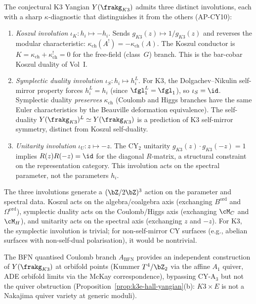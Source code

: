\begin{remark}
\label{rem:k3-yangian-three-involutions}
The conjectural K3 Yangian $Y(\frakg_{K3})$ admits three distinct involutions,
each with a sharp $\kappa$-diagnostic that distinguishes it from the others
(AP-CY10):
\begin{enumerate}[label=\textup{(\roman*)}]
  \item \emph{Koszul involution} $\iota_K \colon h_i \mapsto -h_i$.
  Sends $g_{K3}(z) \mapsto 1/g_{K3}(z)$ and reverses the modular
  characteristic: $\kappa_{\mathrm{ch}}(A^!) = -\kappa_{\mathrm{ch}}(A)$.
  The Koszul conductor is $K = \kappa_{\mathrm{ch}} + \kappa_{\mathrm{ch}}^! = 0$
  for the free-field (class~$G$) branch.
  This is the bar-cobar Koszul duality of Vol~I.

  \item \emph{Symplectic duality involution} $\iota_S \colon h_i \mapsto h_i^L$.
  For K3, the Dolgachev--Nikulin self-mirror property forces
  $h_i^L = h_i$ (since $\fgl_1^L = \fgl_1$), so $\iota_S = \id$.
  Symplectic duality \emph{preserves} $\kappa_{\mathrm{ch}}$ (Coulomb
  and Higgs branches have the same Euler characteristics by
  the Beauville deformation equivalence).  The self-duality
  $Y(\frakg_{K3})^L \simeq Y(\frakg_{K3})$ is a prediction of
  K3 self-mirror symmetry, distinct from Koszul self-duality.

  \item \emph{Unitarity involution} $\iota_U \colon z \mapsto -z$.
  The CY$_2$ unitarity $g_{K3}(z) \cdot g_{K3}(-z) = 1$
  implies $R(z) R(-z) = \id$ for the diagonal $R$-matrix,
  a structural constraint on the representation category.
  This involution acts on the spectral parameter, not the
  parameters $h_i$.
\end{enumerate}
The three involutions generate a $(\bZ/2\bZ)^3$ action on the parameter
and spectral data.  Koszul acts on the algebra/coalgebra axis (exchanging
$B^{\mathrm{ord}}$ and $\Omega^{\mathrm{ord}}$), symplectic duality acts on the
Coulomb/Higgs axis (exchanging $\cM_C$ and $\cM_H$), and unitarity acts
on the spectral axis (exchanging $z$ and $-z$).  For K3, the symplectic
involution is trivial; for non-self-mirror CY surfaces (e.g., abelian
surfaces with non-self-dual polarisation), it would be nontrivial.

The BFN quantised Coulomb branch $A_{\mathrm{BFN}}$ provides an independent
construction of $Y(\frakg_{K3})$ at orbifold points (Kummer $T^4/\bZ_2$
via the affine $A_1$ quiver, ADE orbifold limits via the McKay
correspondence), bypassing CY-A$_3$ but not the quiver obstruction
(Proposition~\ref{prop:k3e-hall-yangian}(b): $K3 \times E$ is not a
Nakajima quiver variety at generic moduli).
\end{remark}

